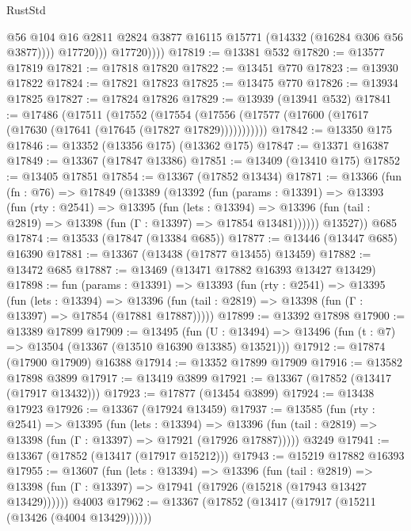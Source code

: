 \begin{lexlean}{RustStd}
\begin{coremodule}
                      @56
                      @104
                      @16
                      @2811
                      @2824
                      @3877
                      @16115
                      @15771
                      (@14332 (@16284 @306 @56 @3877))))
                  @17720)))
            @17720))))
@17819 := @13381 @532
@17820 := @13577 @17819
@17821 := @17818 @17820
@17822 := @13451 @770
@17823 := @13930 @17822
@17824 := @17821 @17823
@17825 := @13475 @770
@17826 := @13934 @17825
@17827 := @17824 @17826
@17829 := @13939 (@13941 @532)
@17841 := @17486
    (@17511
      (@17552
        (@17554 (@17556 (@17577 (@17600 (@17617 (@17630 (@17641 (@17645 (@17827 @17829)))))))))))
@17842 := @13350 @175
@17846 := @13352 (@13356 @175) (@13362 @175)
@17847 := @13371 @16387
@17849 := @13367 (@17847 @13386)
@17851 := @13409 (@13410 @175)
@17852 := @13405 @17851
@17854 := @13367 (@17852 @13434)
@17871 := @13366
    (fun (fn : @76) =>
    @17849
      (@13389
        (@13392
          (fun (params : @13391) =>
          @13393
            (fun (rty : @2541) =>
            @13395
              (fun (lets : @13394) =>
              @13396 (fun (tail : @2819) => @13398 (fun (Γ : @13397) => @17854 @13481))))))
        @13527))
    @685
@17874 := @13533 (@17847 (@13384 @685))
@17877 := @13446 (@13447 @685) @16390
@17881 := @13367 (@13438 (@17877 @13455) @13459)
@17882 := @13472 @685
@17887 := @13469 (@13471 @17882 @16393 @13427 @13429)
@17898 := fun (params : @13391) =>
  @13393
    (fun (rty : @2541) =>
    @13395
      (fun (lets : @13394) =>
      @13396 (fun (tail : @2819) => @13398 (fun (Γ : @13397) => @17854 (@17881 @17887)))))
@17899 := @13392 @17898
@17900 := @13389 @17899
@17909 := @13495
    (fun (U : @13494) => @13496 (fun (t : @7) => @13504 (@13367 (@13510 @16390 @13385) @13521)))
@17912 := @17874 (@17900 @17909) @16388
@17914 := @13352 @17899 @17909
@17916 := @13582 @17898 @3899
@17917 := @13419 @3899
@17921 := @13367 (@17852 (@13417 (@17917 @13432)))
@17923 := @17877 (@13454 @3899)
@17924 := @13438 @17923
@17926 := @13367 (@17924 @13459)
@17937 := @13585
    (fun (rty : @2541) =>
    @13395
      (fun (lets : @13394) =>
      @13396 (fun (tail : @2819) => @13398 (fun (Γ : @13397) => @17921 (@17926 @17887)))))
    @3249
@17941 := @13367 (@17852 (@13417 (@17917 @15212)))
@17943 := @15219 @17882 @16393
@17955 := @13607
    (fun (lets : @13394) =>
    @13396
      (fun (tail : @2819) =>
      @13398 (fun (Γ : @13397) => @17941 (@17926 (@15218 (@17943 @13427 @13429))))))
    @4003
@17962 := @13367 (@17852 (@13417 (@17917 (@15211 (@13426 (@4004 @13429))))))

\end{coremodule}
\end{lexlean}
